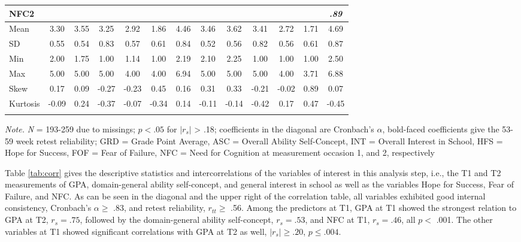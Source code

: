 \documentclass[
  man]{apa6}
\begin{document}
\begin{table}[tbp]
\begin{center}
\begin{threeparttable}
{\begin{tabular}{lcccccccccccc}
NFC2 &  &  &  &  &  &  &  &  &  &  &  & \textit{.89}\\ \midrule
Mean & 3.30 & 3.55 & 3.25 & 2.92 & 1.86 & 4.46 & 3.46 & 3.62 & 3.41 & 2.72 & 1.71 & 4.69\\
SD & 0.55 & 0.54 & 0.83 & 0.57 & 0.61 & 0.84 & 0.52 & 0.56 & 0.82 & 0.56 & 0.61 & 0.87\\
Min & 2.00 & 1.75 & 1.00 & 1.14 & 1.00 & 2.19 & 2.10 & 2.25 & 1.00 & 1.00 & 1.00 & 2.50\\
Max & 5.00 & 5.00 & 5.00 & 4.00 & 4.00 & 6.94 & 5.00 & 5.00 & 5.00 & 4.00 & 3.71 & 6.88\\
Skew & 0.17 & 0.09 & -0.27 & -0.23 & 0.45 & 0.16 & 0.31 & 0.33 & -0.21 & -0.02 & 0.89 & 0.07\\
Kurtosis & -0.09 & 0.24 & -0.37 & -0.07 & -0.34 & 0.14 & -0.11 & -0.14 & -0.42 & 0.17 & 0.47 & -0.45\\
\bottomrule
\addlinespace
\end{tabular}

}

\begin{tablenotes}[para]
\normalsize{\textit{Note.} \textit{N} = 193-259 due to missings; $p < .05$ for $|r_{s}|$ > .18; coefficients in the diagonal are Cronbach’s $\alpha$, bold-faced coefficients give the 53-59 week retest reliability; GRD = Grade Point Average, ASC = Overall Ability Self-Concept, INT = Overall Interest in School, HFS = Hope for Success, FOF = Fear of Failure, NFC = Need for Cognition at measurement occasion 1, and 2, respectively}
\end{tablenotes}

\end{threeparttable}
\end{center}

\end{table}

Table \ref{tab:corr} gives the descriptive statistics and intercorrelations of the variables of interest in this analysis step, i.e., the T1 and T2 measurements of GPA, domain-general ability self-concept, and general interest in school as well as the variables Hope for Success, Fear of Failure, and NFC. As can be seen in the diagonal and the upper right of the correlation table, all variables exhibited good internal consistency, Cronbach's \(\alpha\ge\) .83, and retest reliability, \(r_{tt}\ge\) .56. Among the predictors at T1, GPA at T1 showed the strongest relation to GPA at T2, \(r_{s}=.75\), followed by the domain-general ability self-concept, \(r_{s}=.53\), and NFC at T1, \(r_{s}=.46\), all \(p<\) .001. The other variables at T1 showed significant correlations with GPA at T2 as well, \(|r_{s}|\ge.20\), \(p\le.004\).
\end{document}
